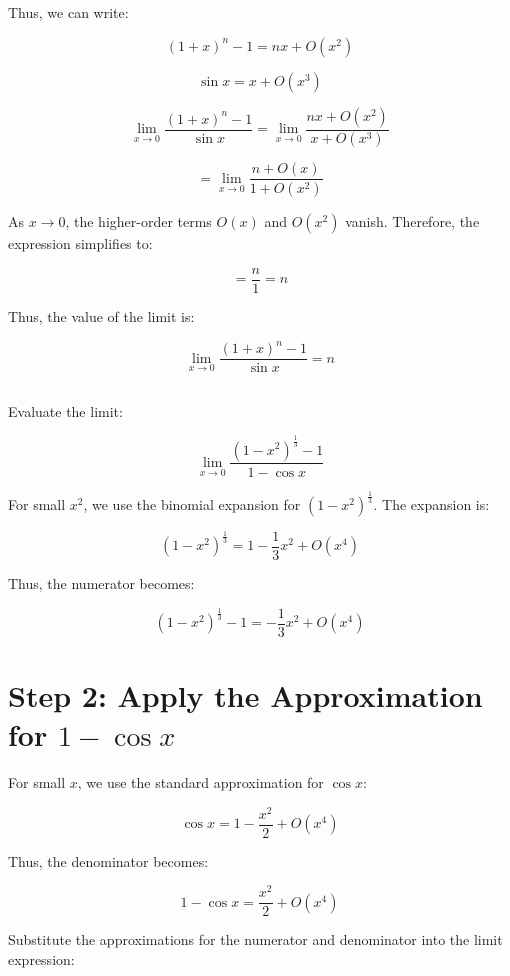 \documentclass{article}
\begin{document}
	Thus, we can write:
	
	\[
	(1+x)^n - 1 = nx + O(x^2)
	\]
	

	
	
	\[
	\sin x = x + O(x^3)
	\]
	
	
	
	\[
	\lim_{x \to 0} \frac{(1+x)^n - 1}{\sin x} = \lim_{x \to 0} \frac{nx + O(x^2)}{x + O(x^3)}
	\]
	
	\[
	= \lim_{x \to 0} \frac{n + O(x)}{1 + O(x^2)}
	\]
	
	As \( x \to 0 \), the higher-order terms \( O(x) \) and \( O(x^2) \) vanish. Therefore, the expression simplifies to:
	
	\[
	= \frac{n}{1} = n
	\]
	

	Thus, the value of the limit is:
	
	\[
	\lim_{x \to 0} \frac{(1+x)^n - 1}{\sin x} = n
	\]



\subsection{}

	Evaluate the limit:
	
	\[
	\lim_{x \to 0} \frac{{(1-x^2)}^{\frac{1}{3}} - 1}{1 - \cos x}
	\]
	

	
	For small \( x^2 \), we use the binomial expansion for \( (1 - x^2)^{\frac{1}{3}} \). The expansion is:
	
	\[
	(1 - x^2)^{\frac{1}{3}} = 1 - \frac{1}{3}x^2 + O(x^4)
	\]
	
	Thus, the numerator becomes:
	
	\[
	(1 - x^2)^{\frac{1}{3}} - 1 = -\frac{1}{3}x^2 + O(x^4)
	\]
	
	\section*{Step 2: Apply the Approximation for \( 1 - \cos x \)}
	
	For small \( x \), we use the standard approximation for \( \cos x \):
	
	\[
	\cos x = 1 - \frac{x^2}{2} + O(x^4)
	\]
	
	Thus, the denominator becomes:
	
	\[
	1 - \cos x = \frac{x^2}{2} + O(x^4)
	\]
	

	
	Substitute the approximations for the numerator and denominator into the limit expression:
	
\end{document}
